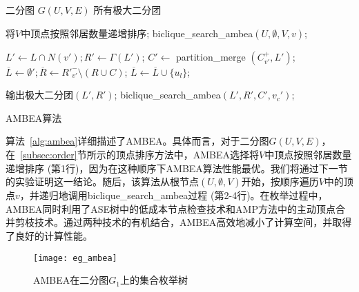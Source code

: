 \begin{algorithm}[H]
  \begin{algorithmic}[1]
    \normalsize
    \REQUIRE 二分图 $G(U,V,E)$
    \ENSURE 所有极大二分团
    
    \renewcommand{\algorithmicwhile}{\textbf{procedure}}
    \renewcommand{\algorithmicdo}{\textbf{:}}

    \STATE 将$V$中顶点按照邻居数量递增排序;
      \STATE \textsf{biclique\_search\_ambea}$(U,\emptyset,V,v)$;
    \ENDFOR

    \renewcommand{\algorithmicdo}{\textbf{do}}
      \STATE $L' \leftarrow L \cap N(v'); R' \leftarrow \Gamma(L')$;
      \STATE $C' \leftarrow$ \textsf{partition\_merge}    $(C_{v'}^+, L')$;
      \STATE $\overline{L} \leftarrow \emptyset'; \overline{R}\leftarrow {R'}_{v'}^- \setminus (R \cup C)$;
          \STATE $\overline{L} \leftarrow \overline{L} \cup \{u_l\}$;
        \ENDIF
      \ENDFOR

        \STATE 输出极大二分团$(L', R')$;
            \STATE \textsf{biclique\_search\_ambea}$(L', R', C', v_c')$;
          \ENDIF
        \ENDFOR
      \ENDIF
    \ENDWHILE

  \end{algorithmic}
  \caption{AMBEA算法}
  \label{alg:ambea}
\end{algorithm}

算法~\ref{alg:ambea}详细描述了AMBEA。具体而言，对于二分图$G(U,V,E)$，在~\ref{subsec:order}节所示的顶点排序方法中，AMBEA选择将$V$中顶点按照邻居数量递增排序 (第1行)，因为在这种顺序下AMBEA算法性能最优。我们将通过下一节的实验证明这一结论。随后，该算法从根节点$(U,\emptyset,V)$开始，按顺序遍历$V$中的顶点$v$，并递归地调用\textsf{biclique\_search\_ambea}过程 (第2-4行)。在枚举过程中，AMBEA同时利用了ASE树中的低成本节点检查技术和AMP方法中的主动顶点合并剪枝技术。通过两种技术的有机结合，AMBEA高效地减小了计算空间，并取得了良好的计算性能。

\begin{figure} [H]
	\centering
	
  \texttt{[image: eg\_ambea]}

	\caption{AMBEA在二分图$G_1$上的集合枚举树}
	\label{fig:ambea}
\end{figure}

